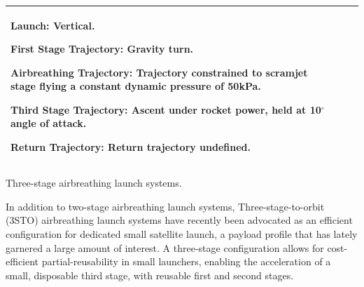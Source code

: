 {\begin{landscape}
\begin{xltabular}{\linewidth}{|X|X|X|}
	
	\textbf{Launch:} Vertical.
	
	\textbf{First Stage Trajectory:} Gravity turn. 
	
	\textbf{Airbreathing Trajectory:} Trajectory constrained to scramjet stage flying a constant dynamic pressure of 50kPa. 
	
	\textbf{Third Stage Trajectory:} Ascent under rocket power, held at 10$^\circ$ angle of attack. 
	
	\textbf{Return Trajectory:} Return trajectory undefined. 
	
	\\
	\hline
\end{xltabular}
\begin{table}[H]
	
	
	\caption{Three-stage airbreathing launch systems.}
	\label{tab:threestage}
\end{table}
\end{landscape}
}
\noindent
In addition to two-stage airbreathing launch systems, Three-stage-to-orbit (3STO) airbreathing launch systems have recently been advocated as an efficient configuration for dedicated small satellite launch, a payload profile that has lately garnered a large amount of interest. A three-stage configuration allows for cost-efficient partial-reusability in small launchers, enabling the acceleration of a small, disposable third stage, with reusable first and second stages. 
